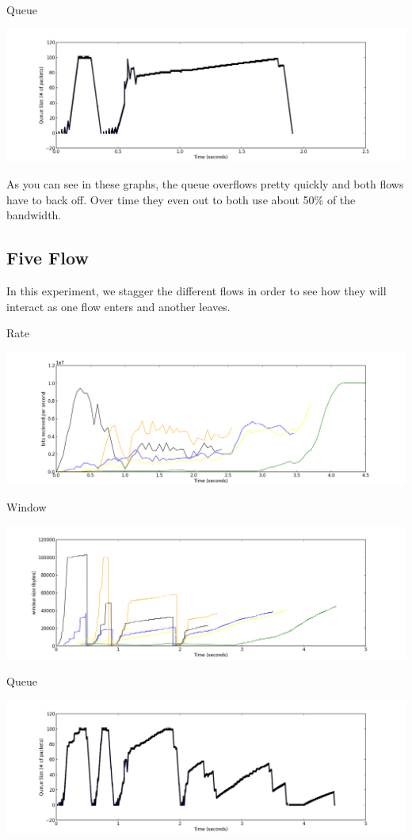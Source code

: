 \documentclass[11pt]{article}
\begin{document}
Queue

\centerline{\includegraphics[width=22cm]{queue_time_two.png}}

As you can see in these graphs, the queue overflows pretty quickly and both flows have to back off. Over time they even out to both use about 50\% of the bandwidth.

\subsection{Five Flow}

In this experiment, we stagger the different flows in order to see how they will interact as one flow enters and another leaves.

Rate

\centerline{\includegraphics[width=22cm]{plot_rate_five.png}}

Window

\centerline{\includegraphics[width=22cm]{window_time_five.png}}

Queue

\centerline{\includegraphics[width=22cm]{queue_time_five.png}}
\end{document}
